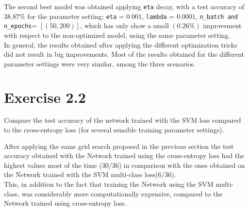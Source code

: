 \documentclass[11pt]{article}
\begin{document}
\begin{itemize}
The second best model was obtained applying \texttt{eta} decay, with a test accuracy of $38.87\%$ for the parameter setting: \texttt{eta} = $0.001$, \texttt{lambda} = $0.0001$, \texttt{n\_batch and n\_epochs}= $[(50, 200)]$, which has only show a small $(0.26\%)$ improvement with respect to the non-optimized model, using the same parameter setting.\\ 

In general, the results obtained after applying the different optimization tricks did not result in big improvements. Most of the results obtained for the different parameter settings were very similar, among the three scenarios. 
\end{itemize}

\section{Exercise 2.2} 
\begin{tcolorbox}
Compare the test accuracy of the network trained with the SVM loss compared to the cross-entropy loss (for several sensible training parameter settings).
\end{tcolorbox}

After applying the same grid search proposed in the previous section the test accuracy obtained with the Network trained using the cross-entropy loss had the highest values most of the time ($30/36$)  in comparison with  the ones obtained on the Network trained with the SVM multi-class loss($6/36$).\\

This, in addition to the fact that training the Network using the SVM multi-class, was considerably more computationally expensive, compared to the Network trained using cross-entropy loss.\\
\end{document}

